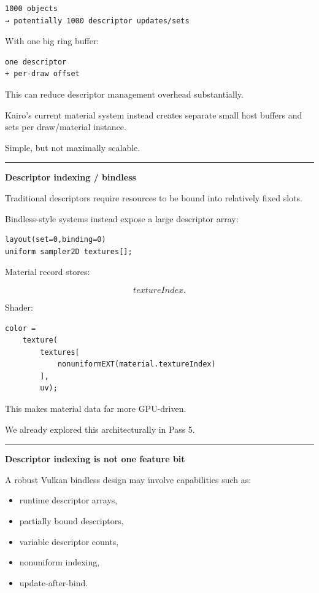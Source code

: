\begin{verbatim}
1000 objects
→ potentially 1000 descriptor updates/sets
\end{verbatim}

With one big ring buffer:

\begin{verbatim}
one descriptor
+ per-draw offset
\end{verbatim}

This can reduce descriptor management overhead substantially.

Kairo's current material system instead creates separate small host buffers and sets per draw/material instance.

Simple, but not maximally scalable.

\begin{center}\rule{0.5\linewidth}{0.5pt}\end{center}

\textbf{Descriptor indexing / bindless}

Traditional descriptors require resources to be bound into relatively fixed slots.

Bindless-style systems instead expose a large descriptor array:

\begin{verbatim}
layout(set=0,binding=0)
uniform sampler2D textures[];
\end{verbatim}

Material record stores:

\[
textureIndex.
\]

Shader:

\begin{verbatim}
color =
    texture(
        textures[
            nonuniformEXT(material.textureIndex)
        ],
        uv);
\end{verbatim}

This makes material data far more GPU-driven.

We already explored this architecturally in Pass 5.

\begin{center}\rule{0.5\linewidth}{0.5pt}\end{center}

\textbf{Descriptor indexing is not one feature bit}

A robust Vulkan bindless design may involve capabilities such as:

\begin{itemize}
\tightlist
\item
  runtime descriptor arrays,
\item
  partially bound descriptors,
\item
  variable descriptor counts,
\item
  nonuniform indexing,
\item
  update-after-bind.
\end{itemize}


